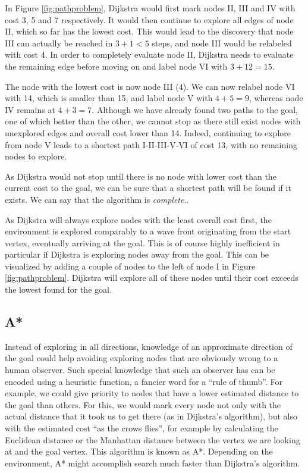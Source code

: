 In Figure \ref{fig:pathproblem}, Dijkstra would first mark nodes II, III and IV with cost 3, 5 and 7 respectively. It would then continue to explore all edges of node II, which so far has the lowest cost. This would lead to the discovery that node III can actually be reached in $3+1<5$ steps, and node III would be relabeled with cost 4. In order to completely evaluate node II, Dijkstra needs to evaluate the remaining edge before moving on and label node VI with $3+12=15$.

The node with the lowest cost is now node III (4). We can now relabel node VI with 14, which is smaller than 15, and label node V with $4+5=9$, whereas node IV remains at $4+3=7$. Although we have already found two paths to the goal, one of which better than the other, we cannot stop as there still exist nodes with unexplored edges and overall cost lower than 14. Indeed, continuing to explore from node V leads to a shortest path I-II-III-V-VI of cost 13, with no remaining nodes to explore.

As Dijkstra would not stop until there is no node with lower cost than the current cost to the goal, we can be sure that a shortest path will be found if it exists. We can say that the algorithm is \emph{complete}..

As Dijkstra will always explore nodes with the least overall cost first, the environment is explored comparably to a wave front originating from the start vertex, eventually arriving at the goal. This is of course highly inefficient in particular if Dijkstra is exploring nodes away from the goal. This can be visualized by adding a couple of nodes to the left of node I in Figure \ref{fig:pathproblem}. Dijkstra will explore all of these nodes until their cost exceeds the lowest found for the goal.

\subsection{A*}\label{sec:astar}
Instead of exploring in all directions, knowledge of an approximate direction of the goal could help avoiding exploring nodes that are obviously wrong to a human observer. Such special knowledge that such an observer has can be encoded using a heuristic function, a fancier word for a ``rule of thumb''. For example, we could give priority to nodes that have a lower estimated distance to the goal than others. For this, we would mark every node not only with the actual distance that it took us to get there (as in Dijkstra's algorithm), but also with the estimated cost ``as the crows flies'', for example by calculating the Euclidean distance or the Manhattan distance between the vertex we are looking at and the goal vertex. This algorithm is known as A*. Depending on the environment, A* might accomplish search much faster than Dijkstra's algorithm. 

